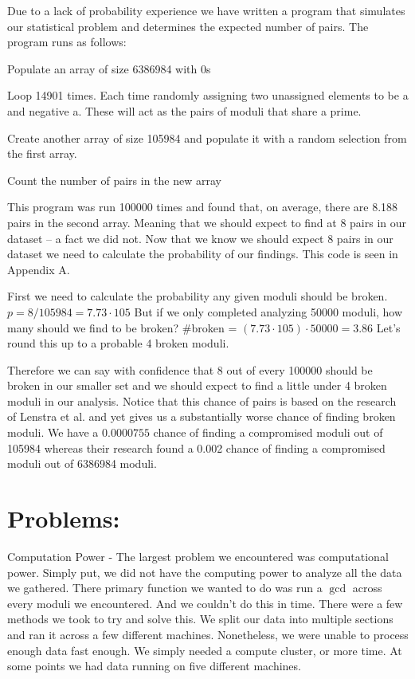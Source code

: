 \documentclass[11pt,twoside]{article}
\begin{document}
\begin{multicols}{2}
Due to a lack of probability experience we have written a program that simulates
our statistical problem and determines the expected number of pairs. The program
runs as follows:
\begin{compactitem}
\item Populate an array of size 6386984 with 0s
\item Loop 14901 times. Each time randomly assigning two unassigned elements to
be a and negative a. These will act as the pairs of moduli that share a prime.
\item Create another array of size 105984 and populate it with a random 
selection from the first array.
\item Count the number of pairs in the new array
\end{compactitem}
This program was run 100000 times and found that, on average, there are 8.188
pairs in the second array. Meaning that we should expect to find at 8 pairs in
our dataset – a fact we did not. Now that we know we should expect 8 pairs in 
our dataset we need to calculate the probability of our findings. This code is
seen in Appendix A.

First we need to calculate the probability any given moduli should be broken. 
$p = 8/105 984= 7.73\cdot105$
But if we only completed analyzing 50000 moduli, how many should we find to be 
broken? \#broken = $(7.73\cdot105)\cdot50000 = 3.86$ Let's round this up to a 
probable 4 broken moduli. 

Therefore we can say with confidence that 8 out of every 100000 should be
broken in our smaller set and we should expect to find a little under 4 broken
moduli in our analysis. Notice that this chance of pairs is based on the
research of Lenstra et al. and yet gives us a substantially worse chance of
finding broken moduli. We have a $0.0000755$ chance of finding a compromised
moduli out of 105984 whereas their research found a 0.002 chance of finding a
compromised moduli out of 6386984 moduli.

\section{Problems:}

Computation Power - The largest problem we encountered was computational power.
Simply put, we did not have the computing power to analyze all the data we
gathered. There primary function we wanted to do was run a $\gcd$ across
every moduli we encountered. And we couldn't do this in time. There were a few
methods we took to try and solve this. We split our data into multiple sections
and ran it across a few different machines. Nonetheless, we were unable to
process enough data fast enough. We simply needed a compute cluster, or more
time. At some points we had data running on five different machines.


\end{multicols}
\end{document}
